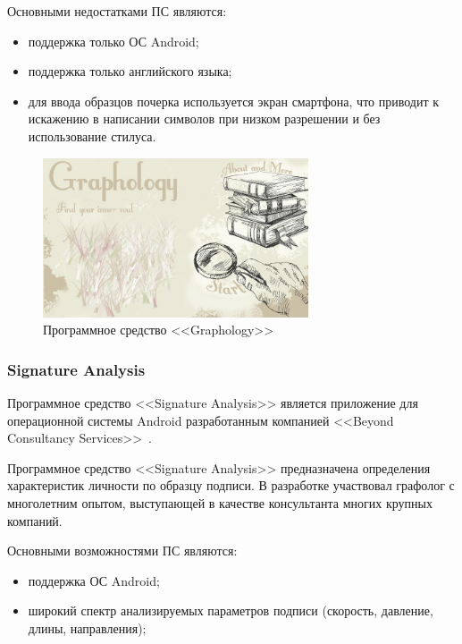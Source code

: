 Основными недостатками ПС являются:
\begin{itemize}
  \item поддержка только ОС Android;
  \item поддержка только английского языка;
  \item для ввода образцов почерка используется экран смартфона, что приводит к искажению в написании символов при низком разрешении и без использование стилуса.
\end{itemize}

\begin{figure}[ht]
    \centering
    \label{fig:domain:analogs:graphology}
    \includegraphics[width=0.7\textwidth]{figures/graphology_analog.jpeg}
    \caption{Программное средство <<Graphology>>}
\end{figure}

\subsubsection{Signature Analysis}
\label{sub:domain:analogs:signature_analysis} 

Программное средство <<Signature Analysis>> является приложение для операционной системы Android разработанным компанией <<Beyond Consultancy Services>>~\cite{analogs_signature_analysis}.

Программное средство <<Signature Analysis>> предназначена определения характеристик личности по образцу подписи. В разработке участвовал графолог с многолетним опытом, выступающей в качестве консультанта многих крупных компаний.

Основными возможностями ПС являются:
\begin{itemize}
  \item поддержка ОС Android;
  \item широкий спектр анализируемых параметров подписи (скорость, давление, длины, направления);
\end{itemize}

